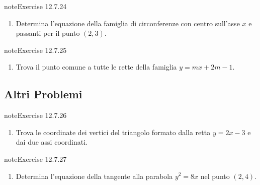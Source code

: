 \documentclass[letterpaper,10pt,italian]{jupyterBook}
\begin{document}
\begin{sphinxadmonition}{note}{Exercise 12.7.24}


\begin{enumerate}
%
\setcounter{enumi}{23}
\item {} 
\sphinxAtStartPar
Determina l’equazione della famiglia di circonferenze con centro sull’asse \( x \) e passanti per il punto \( (2, 3) \).

\end{enumerate}
\end{sphinxadmonition}
 \label{exercise:ch/analytic_geometry/analytic_geometry_2d/problems-exercise-24}

\begin{sphinxadmonition}{note}{Exercise 12.7.25}


\begin{enumerate}
%
\setcounter{enumi}{24}
\item {} 
\sphinxAtStartPar
Trova il punto comune a tutte le rette della famiglia \( y = mx + 2m - 1 \).

\end{enumerate}
\end{sphinxadmonition}


\subsection{Altri Problemi}
\label{\detokenize{ch/analytic_geometry/analytic_geometry_2d/problems:altri-problemi}} \label{exercise:ch/analytic_geometry/analytic_geometry_2d/problems-exercise-25}

\begin{sphinxadmonition}{note}{Exercise 12.7.26}


\begin{enumerate}
%
\setcounter{enumi}{25}
\item {} 
\sphinxAtStartPar
Trova le coordinate dei vertici del triangolo formato dalla retta \( y = 2x - 3 \) e dai due assi coordinati.

\end{enumerate}
\end{sphinxadmonition}
 \label{exercise:ch/analytic_geometry/analytic_geometry_2d/problems-exercise-26}

\begin{sphinxadmonition}{note}{Exercise 12.7.27}


\begin{enumerate}
%
\setcounter{enumi}{26}
\item {} 
\sphinxAtStartPar
Determina l’equazione della tangente alla parabola \( y^2 = 8x \) nel punto \( (2, 4) \).

\end{enumerate}
\end{sphinxadmonition}
 \label{exercise:ch/analytic_geometry/analytic_geometry_2d/problems-exercise-27}
\end{document}
